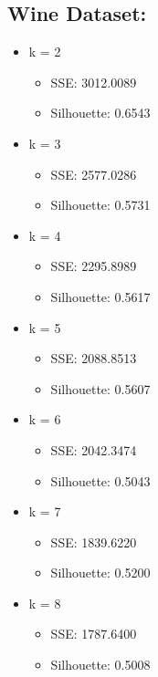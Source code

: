 \documentclass{article}
\begin{document}
\subsection{Wine Dataset:}
\begin{itemize}

    \item{k = 2}
        \begin{itemize}
            \item SSE: 3012.0089
            \item Silhouette: 0.6543
        \end{itemize}
        
    \item{k = 3}
         \begin{itemize}
            \item SSE: 2577.0286
            \item Silhouette: 0.5731
        \end{itemize}
        
    \item{k = 4}
         \begin{itemize}
            \item SSE: 2295.8989
            \item Silhouette: 0.5617
        \end{itemize}
        
    \item{k = 5}
        \begin{itemize}
            \item SSE: 2088.8513
            \item Silhouette: 0.5607
        \end{itemize}
        
    \item{k = 6}
        \begin{itemize}
            \item SSE: 2042.3474
            \item Silhouette: 0.5043
        \end{itemize}
        
    \item{k = 7}
        \begin{itemize}
            \item SSE: 1839.6220
            \item Silhouette: 0.5200
        \end{itemize}
        
    \item{k = 8}
        \begin{itemize}
            \item SSE: 1787.6400
            \item Silhouette: 0.5008
        \end{itemize}
        

\end{itemize}
\end{document}
